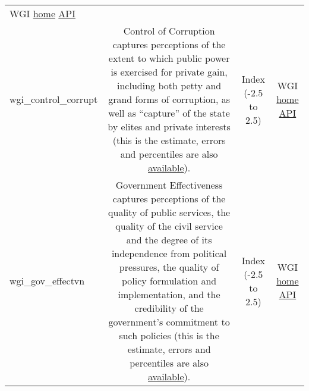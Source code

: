 \documentclass[]{article}
\begin{document}
\begin{longtable}[]{@{}lccc@{}}
\begin{minipage}[t]{0.15\columnwidth}
WGI \href{https://info.worldbank.org/governance/wgi/\#home}{home}
\href{https://api.worldbank.org/v2/sources/3/indicators}{API}\strut
\end{minipage}\tabularnewline
\begin{minipage}[t]{0.14\columnwidth}\raggedright\strut
wgi\_control\_corrupt\strut
\end{minipage} & \begin{minipage}[t]{0.36\columnwidth}\centering\strut
Control of Corruption captures perceptions of the extent to which public
power is exercised for private gain, including both petty and grand
forms of corruption, as well as ``capture'' of the state by elites and
private interests (this is the estimate, errors and percentiles are also
\href{https://info.worldbank.org/governance/wgi/\#home}{available}).\strut
\end{minipage} & \begin{minipage}[t]{0.24\columnwidth}\centering\strut
Index (-2.5 to 2.5)\strut
\end{minipage} & \begin{minipage}[t]{0.15\columnwidth}\centering\strut
WGI \href{https://info.worldbank.org/governance/wgi/\#home}{home}
\href{https://api.worldbank.org/v2/sources/3/indicators}{API}\strut
\end{minipage}\tabularnewline
\begin{minipage}[t]{0.14\columnwidth}\raggedright\strut
wgi\_gov\_effectvn\strut
\end{minipage} & \begin{minipage}[t]{0.36\columnwidth}\centering\strut
Government Effectiveness captures perceptions of the quality of public
services, the quality of the civil service and the degree of its
independence from political pressures, the quality of policy formulation
and implementation, and the credibility of the government's commitment
to such policies (this is the estimate, errors and percentiles are also
\href{https://info.worldbank.org/governance/wgi/\#home}{available}).\strut
\end{minipage} & \begin{minipage}[t]{0.24\columnwidth}\centering\strut
Index (-2.5 to 2.5)\strut
\end{minipage} & \begin{minipage}[t]{0.15\columnwidth}\centering\strut
WGI \href{https://info.worldbank.org/governance/wgi/\#home}{home}
\href{https://api.worldbank.org/v2/sources/3/indicators}{API}\strut
\end{minipage}\tabularnewline

\end{longtable}
\end{document}
